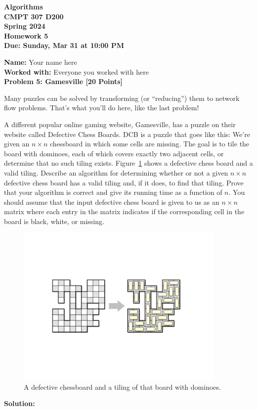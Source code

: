 \documentclass[12pt]{article}
\newcommand{\Name}[1]{\noindent \textbf{Name:} #1 \\}
\newcommand{\Workedwith}[1]{\noindent \textbf{Worked with:} #1 \\}
\newcommand{\Problem}[3]{\mbox{} \newline \noindent \textbf{\textbf{Problem #1: #2 [#3 Points] \\ }}}
\begin{document}
\begin{center}
  \bf
  Algorithms \\
  CMPT 307 D200 \\
  Spring 2024 \\
  \rm
  Homework 5\\
  Due:  Sunday, Mar 31 at 10:00 PM \\
\end{center}

\Name{Your name here}
\Workedwith{Everyone you worked with here}

\Problem{5}{Gamesville}{20}

Many puzzles can be solved by transforming (or ``reducing'') them to network flow problems.  That's what you'll do here, like the last problem!

A different popular online gaming website, Gamesville, has a puzzle on their website called Defective Chess Boards. DCB is a puzzle that goes like this:  We're given an $n \times n$ chessboard in which some cells are missing.  The goal is to tile the board with dominoes, each of which covers exactly two adjacent cells, or determine
that no such tiling exists.  Figure~\ref{fig:dominoes} shows a defective chess board and a valid tiling.  Describe an algorithm for determining whether or not a given $n \times n$ defective chess board has a valid tiling and, if it does, to find that tiling.  Prove
that your algorithm is correct and give its running time as a function of $n$.  You should assume that the input defective chess board is given to us as an $n \times n$ matrix where each entry in the matrix indicates if the corresponding cell in the board is black, white, or missing.

\begin{figure}[h]
\begin{center}
\includegraphics[width=4in]{Dominoes.pdf}
\end{center}
\caption{A defective chessboard and a tiling of that board with dominoes.}
\label{fig:dominoes}
\end{figure}

\textbf{Solution:}
\end{document}
